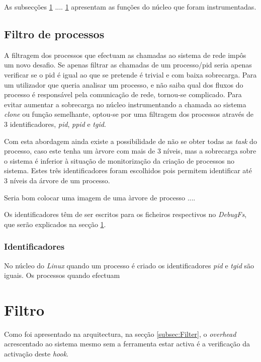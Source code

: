 As subsecções \ref{} .... \ref{} apresentam as funções do núcleo que foram instrumentadas.

%
%

\subsection{Filtro de processos}
A filtragem dos processos que efectuam as chamadas ao sistema de rede impôs um novo desafio.
 Se apenas filtrar as chamadas de um processo/pid seria apenas verificar se o pid é igual ao que se pretende é trivial e com baixa sobrecarga.
 Para um utilizador que queria analisar um processo, e não saiba qual dos fluxos do processo é responsável pela comunicação de rede, tornou-se complicado.
 Para evitar aumentar a sobrecarga no núcleo instrumentando a chamada ao sistema \textit{clone} ou função semelhante, optou-se por uma filtragem dos processos através de 3 identificadores, \textit{pid}, \textit{ppid} e \textit{tgid}.

Com esta abordagem ainda existe a possibilidade de não se obter todas as \textit{task} do processo, caso este tenha um àrvore com mais de 3 níveis, mas a sobrecarga sobre o sistema é inferior à situação de monitorização da criação de processos no sistema.
 Estes três identificadores foram escolhidos pois permitem identificar até 3 níveis da árvore de um processo.

Seria bom colocar uma imagem de uma àrvore de processo .... 

Os identificadores têm de ser escritos para os ficheiros respectivos no \textit{DebugFs}, que serão explicados na secção \ref{}.



\subsubsection{Identificadores}

No núcleo do \textit{Linux} quando um processo é criado os identificadores \textit{pid} e \textit{tgid} são iguais.
Os processos quando efectuam



\section{Filtro}

Como foi apresentado na arquitectura, na secção \ref{subsec:Filter}, o \textit{overhead} acrescentado ao sistema mesmo sem a ferramenta estar activa é
a verificação da activação deste \textit{hook}.

